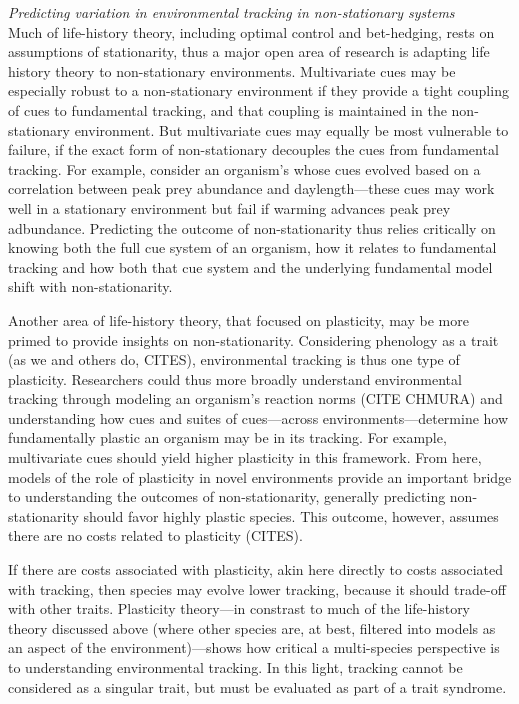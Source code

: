 \documentclass[11pt,letterpaper]{article}
\begin{document}
\emph{Predicting variation in environmental tracking in non-stationary systems}\\
Much of life-history theory, including optimal control and bet-hedging, rests on assumptions of stationarity, thus a major open area of research is adapting life history theory to non-stationary environments. Multivariate cues may be especially robust to a non-stationary environment if they provide a tight coupling of cues to fundamental tracking, and that coupling is maintained in the non-stationary environment. But multivariate cues may equally be most vulnerable to failure, if the exact form of non-stationary decouples the cues from fundamental tracking. For example, consider an organism's whose cues evolved based on a correlation between peak prey abundance and daylength---these cues may work well in a stationary environment but fail if warming advances peak prey adbundance. Predicting the outcome of non-stationarity thus relies critically on knowing both the full cue system of an organism, how it relates to fundamental tracking and how both that cue system and the underlying fundamental model shift with non-stationarity. 

Another area of life-history theory, that focused on plasticity, may be more primed to provide insights on non-stationarity. Considering phenology as a trait (as we and others do, CITES), environmental tracking is thus one type of plasticity. Researchers could thus more broadly understand environmental tracking through modeling an organism's reaction norms (CITE CHMURA) and understanding how cues and suites of cues---across environments---determine how fundamentally plastic an organism may be in its tracking. For example, multivariate cues should yield higher plasticity in this framework. From here, models of the role of plasticity in novel environments provide an important bridge to understanding the outcomes of non-stationarity, generally predicting non-stationarity should favor highly plastic species. This outcome, however, assumes there are no costs related to plasticity (CITES). 

If there are costs associated with plasticity, akin here directly to costs associated with tracking, then species may evolve lower tracking, because it should trade-off with other traits. Plasticity theory---in constrast to much of the life-history theory discussed above (where other species are, at best, filtered into models as an aspect of the environment)---shows how critical a multi-species perspective is to understanding environmental tracking. In this light, tracking cannot be considered as a singular trait, but must be evaluated as part of a trait syndrome. 
\end{document}

